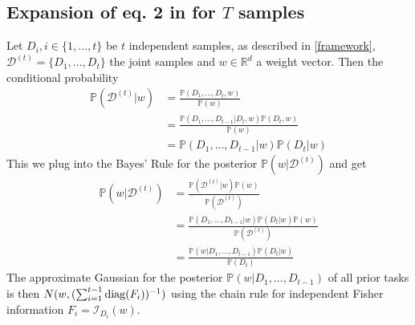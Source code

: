 \subsection{Expansion of eq. 2 in \cite{JK} for $T$ samples}
Let $D_i, i \in \{1, ...,t\}$ be $t$ independent samples, as described in \autoref{framework}, $\mathcal{D}^{(t)} = \{D_1, ..., D_t\}$ the joint samples and $w \in \mathbb{R}^d$ a weight vector. Then the conditional probability 
\begin{equation}
	\begin{split}
		\mathbb{P}(\mathcal{D}^{(t)}|w) & = \frac{\mathbb{P}(D_1, ..., D_t, w)}{\mathbb{P}(w)} \\
		& = \frac{\mathbb{P}(D_1, ...,D_{t-1}|D_t, w) \mathbb{P}(D_t, w)}{\mathbb{P}(w)} \\
		& = \mathbb{P}(D_1, ...,D_{t-1}|w) \mathbb{P}(D_t|w)
	\end{split}
\end{equation}
This we plug into the Bayes' Rule for the posterior $\mathbb{P}(w|\mathcal{D}^{(t)})$ and get 
\begin{equation}
	\begin{split}
		\mathbb{P}(w|\mathcal{D}^{(t)}) & = \frac{\mathbb{P}(\mathcal{D}^{(t)}|w) \mathbb{P}(w)}{\mathbb{P}(\mathcal{D}^{(t)})} \\
		& = \frac{\mathbb{P}(D_1, ...,D_{t-1}|w) \mathbb{P}(D_t|w) \mathbb{P}(w)}{\mathbb{P}(\mathcal{D}^{(t)})} \\
		& = \frac{\mathbb{P}(w|D_1, ...,D_{t-1}) \mathbb{P}(D_t|w)}{\mathbb{P}(D_t)}
	\end{split}
\end{equation}
The approximate Gaussian for the posterior $\mathbb{P}(w|D_1, ...,D_{t-1})$ of all prior tasks is then $N(w, (\sum_{i=1}^{t-1}\operatorname{diag}(F_i))^{-1})$ using the chain rule for independent Fisher information $F_i = \mathcal{I}_{D_i}(w)$.